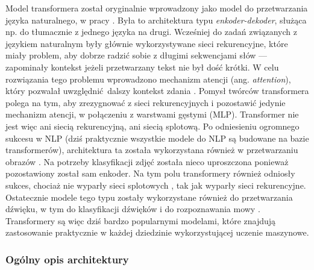 Model transformera został oryginalnie wprowadzony jako model do przetwarzania języka naturalnego, w
pracy \cite{vaswani_attention_2017}. Była to architektura typu \emph{enkoder-dekoder}, służąca np.
do tłumacznie z jednego języka na drugi. Wcześniej do zadań związanych z językiem naturalnym były
głównie wykorzystywane sieci rekurencyjne, które miały problem, aby dobrze radzić sobie z długimi
sekwencjami słów --- zapominały kontekst jeżeli przetwarzany tekst nie był dość krótki. W celu
rozwiązania tego problemu wprowadzono mechanizm atencji (ang. \emph{attention}), który pozwalał
uwzględnić dalszy kontekst zdania \cite{bahdanau_neural_2016}. Pomysł twórców transformera polega na
tym, aby zrezygnować z sieci rekurencyjnych i pozostawić jedynie mechanizm atencji, w połączeniu z
warstwami gęstymi (MLP). Transformer nie jest więc ani siecią rekurencyjną, ani siecią splotową. Po
odniesieniu ogromnego sukcesu w NLP (dziś praktycznie wszystkie modele do NLP są budowane na bazie
transformerów), architektura ta została wykorzystana również w przetwarzaniu obrazów
\cite{dosovitskiy_image_2021}. Na potrzeby klasyfikacji zdjęć została nieco uproszczona ponieważ
pozostawiony został sam enkoder. Na tym polu transformery również odniosły sukces, chociaż nie
wyparły sieci splotowych \cite{liu_convnet_2022}, tak jak wyparły sieci rekurencyjne. Ostatecznie
modele tego typu zostały wykorzystane również do przetwarzania dźwięku, w tym do klasyfikacji
dźwięków \cite{gong_ast_2021} i do rozpoznawania mowy \cite{kim_squeezeformer_2022}. Transformery są
więc dziś bardzo popularnymi modelami, które znajdują zastosowanie praktycznie w każdej dziedzinie
wykorzystującej uczenie maszynowe.

\subsubsection{Ogólny opis architektury}


